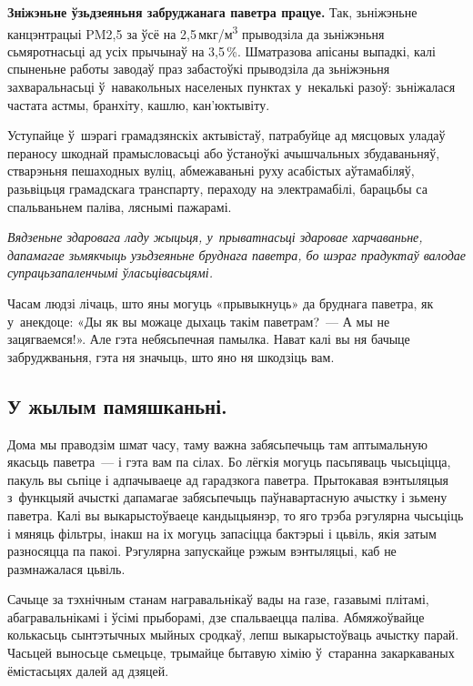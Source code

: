 \textbf{Зніжэньне ўзьдзеяньня забруджанага паветра працуе.} Так, зьніжэньне канцэнтрацыі PM2,5 за ўсё на 2,5\,мкг/м\textsuperscript{3} прыводзіла да зьніжэньня сьмяротнасьці ад усіх прычынаў на 3,5\,\%. Шматразова апісаны выпадкі, калі спыненьне работы заводаў праз забастоўкі прыводзіла да зьніжэньня захваральнасьці ў~навакольных населеных пунктах у~некалькі разоў: зьніжалася частата астмы, бранхіту, кашлю, кан'юктывіту.

Уступайце ў~шэрагі грамадзянскіх актывістаў, патрабуйце ад мясцовых уладаў пераносу шкоднай прамысловасьці або ўстаноўкі ачышчальных збудаваньняў, стварэньня пешаходных вуліц, абмежаваньні руху асабістых аўтамабіляў, разьвіцьця грамадскага транспарту, пераходу на электрамабілі, барацьбы са спальваньнем паліва, ляснымі пажарамі.

\emph{Вядзеньне здаровага ладу жыцьця, у~прыватнасьці здаровае харчаваньне, дапамагае зьмякчыць узьдзеяньне бруднага паветра, бо шэраг прадуктаў валодае супрацьзапаленчымі ўласьцівасьцямі.}

Часам людзі лічаць, што яны могуць «прывыкнуць» да бруднага паветра, як у~анекдоце: «Ды як вы можаце дыхаць такім паветрам?~--- А мы не зацягваемся!». Але гэта небясьпечная памылка. Нават калі вы ня бачыце забруджваньня, гэта ня значыць, што яно ня шкодзіць вам.

\subsection*{У жылым памяшканьні.}

Дома мы праводзім шмат часу, таму важна забясьпечыць там аптымальную якасьць паветра~--- і гэта вам па сілах. Бо лёгкія могуць пасьпяваць чысьціцца, пакуль вы сьпіце і адпачываеце ад гарадзкога паветра. Прытокавая вэнтыляцыя з~функцыяй ачысткі дапамагае забясьпечыць паўнавартасную ачыстку і зьмену паветра. Калі вы выкарыстоўваеце кандыцыянэр, то яго трэба рэгулярна чысьціць і мяняць фільтры, інакш на іх могуць запасіцца бактэрыі і цьвіль, якія затым разносяцца па пакоі. Рэгулярна запускайце рэжым вэнтыляцыі, каб не размнажалася цьвіль.


Сачыце за тэхнічным станам награвальнікаў вады на газе, газавымі плітамі, абагравальнікамі і ўсімі прыборамі, дзе спальваецца паліва. Абмяжоўвайце колькасьць сынтэтычных мыйных сродкаў, лепш выкарыстоўваць ачыстку парай. Часьцей выносьце сьмецьце, трымайце бытавую хімію ў~старанна закаркаваных ёмістасьцях далей ад дзяцей.

